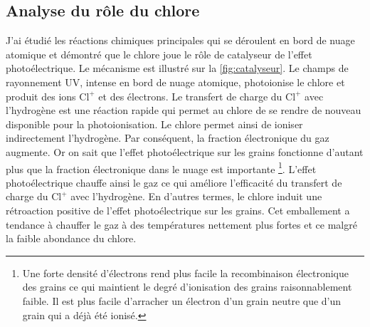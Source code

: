 \subsection{Analyse du rôle du chlore}


J'ai étudié les réactions chimiques principales qui se déroulent en bord de nuage atomique et démontré que le chlore joue le rôle de catalyseur de l'effet photoélectrique. Le mécanisme est illustré sur la \autoref{fig:catalyseur}.
Le champs de rayonnement UV, intense en bord de nuage atomique, photoionise le chlore et produit des ions $\mathrm{Cl}^+$ et des électrons. Le transfert de charge du $\mathrm{Cl}^+$ avec l'hydrogène est une réaction rapide qui permet au chlore de se rendre de nouveau disponible pour la photoionisation. Le chlore permet ainsi de ioniser indirectement l'hydrogène. Par conséquent, la fraction électronique du gaz augmente.  
Or on sait que l'effet photoélectrique sur les grains fonctionne d'autant plus que la fraction électronique dans le nuage est importante \footnote{Une forte densité d'électrons rend plus facile la recombinaison électronique des grains ce qui maintient le degré d'ionisation des grains raisonnablement faible. Il est plus facile d'arracher un électron d'un grain neutre que d'un grain qui a déjà été ionisé.}. 
L'effet photoélectrique chauffe ainsi le gaz ce qui améliore l'efficacité du transfert de charge du $\mathrm{Cl}^+$ avec l'hydrogène. 
En d'autres termes, le chlore induit une rétroaction positive de l'effet photoélectrique sur les grains. Cet emballement a tendance à chauffer le gaz à des températures nettement plus fortes et ce malgré la faible abondance du chlore. \newline

